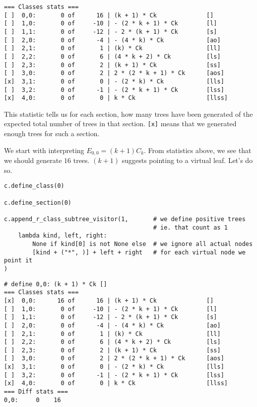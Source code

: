 \documentclass[final]{article}
\theoremstyle{definition}
\theoremstyle{remark}
\begin{document}
\begin{lstlisting}
=== Classes stats ===
[ ]  0,0:       0 of      16 | (k + 1) * Ck              []
[ ]  1,0:       0 of     -10 | - (2 * k + 1) * Ck        [l]
[ ]  1,1:       0 of     -12 | - 2 * (k + 1) * Ck        [s]
[ ]  2,0:       0 of      -4 | - (4 * k) * Ck            [ao]
[ ]  2,1:       0 of       1 | (k) * Ck                  [ll]
[ ]  2,2:       0 of       6 | (4 * k + 2) * Ck          [ls]
[ ]  2,3:       0 of       2 | (k + 1) * Ck              [ss]
[ ]  3,0:       0 of       2 | 2 * (2 * k + 1) * Ck      [aos]
[x]  3,1:       0 of       0 | - (2 * k) * Ck            [lls]
[ ]  3,2:       0 of      -1 | - (2 * k + 1) * Ck        [lss]
[x]  4,0:       0 of       0 | k * Ck                    [llss]
\end{lstlisting}

This statistic tells us for each section, how many trees have been generated of the expected total number of trees in that section. \verb|[x]| means that we generated enough trees for such a section.

We start with interpreting \(E_{0,0} = (k + 1) C_k\). From statistics above, we see that we should generate \(16\) trees. \((k + 1)\) suggests pointing to a virtual leaf. Let's do so.

\begin{lstlisting}
c.define_class(0)

c.define_section(0)

c.append_r_class_subtree_visitor(1,       # we define positive trees
                                          # ie. that count as 1
    lambda kind, left, right:
        None if kind[0] is not None else  # we ignore all actual nodes
        [kind + ("*", )] + left + right   # for each virtual node we point it
)
\end{lstlisting}

\begin{lstlisting}
# define 0,0: (k + 1) * Ck []
=== Classes stats ===
[x]  0,0:      16 of      16 | (k + 1) * Ck              []
[ ]  1,0:       0 of     -10 | - (2 * k + 1) * Ck        [l]
[ ]  1,1:       0 of     -12 | - 2 * (k + 1) * Ck        [s]
[ ]  2,0:       0 of      -4 | - (4 * k) * Ck            [ao]
[ ]  2,1:       0 of       1 | (k) * Ck                  [ll]
[ ]  2,2:       0 of       6 | (4 * k + 2) * Ck          [ls]
[ ]  2,3:       0 of       2 | (k + 1) * Ck              [ss]
[ ]  3,0:       0 of       2 | 2 * (2 * k + 1) * Ck      [aos]
[x]  3,1:       0 of       0 | - (2 * k) * Ck            [lls]
[ ]  3,2:       0 of      -1 | - (2 * k + 1) * Ck        [lss]
[x]  4,0:       0 of       0 | k * Ck                    [llss]
=== Diff stats ===
0,0:     0    16
\end{lstlisting}
\end{document}
